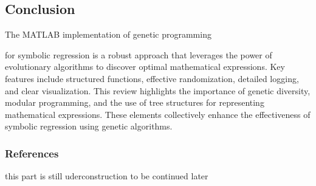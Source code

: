 \documentclass[
  letterpaper,
  DIV=11,
  numbers=noendperiod]{scrartcl}
\begin{document}
\subsection{Conclusion}\label{conclusion}

The MATLAB implementation of genetic programming

for symbolic regression is a robust approach that leverages the power of
evolutionary algorithms to discover optimal mathematical expressions.
Key features include structured functions, effective randomization,
detailed logging, and clear visualization. This review highlights the
importance of genetic diversity, modular programming, and the use of
tree structures for representing mathematical expressions. These
elements collectively enhance the effectiveness of symbolic regression
using genetic algorithms.

\subsubsection{References}\label{references}

this part is still uderconstruction to be continued later
\end{document}

